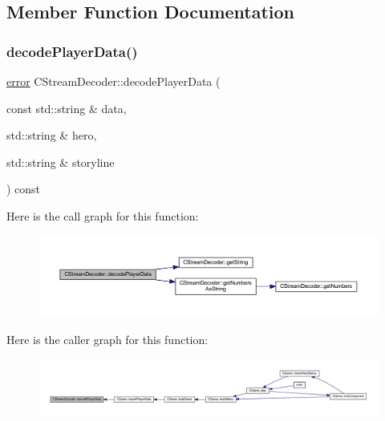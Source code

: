 \subsection{Member Function Documentation}
\mbox{\label{class_c_stream_decoder_a27f04fbbe2eb121fe15988594fe7053f}} 
\subsubsection{\texorpdfstring{decode\+Player\+Data()}{decodePlayerData()}}
{\footnotesize\ttfamily \mbox{\hyperlink{_errors_list_8h_af10dacfa214e2575bb2e0ee407c242e0}{error}} C\+Stream\+Decoder\+::decode\+Player\+Data (\begin{DoxyParamCaption}\item[{const std\+::string \&}]{data,  }\item[{std\+::string \&}]{hero,  }\item[{std\+::string \&}]{storyline }\end{DoxyParamCaption}) const}

Here is the call graph for this function\+:\nopagebreak
\begin{figure}[H]
\begin{center}
\leavevmode
\includegraphics[width=350pt]{class_c_stream_decoder_a27f04fbbe2eb121fe15988594fe7053f_cgraph}
\end{center}
\end{figure}
Here is the caller graph for this function\+:\nopagebreak
\begin{figure}[H]
\begin{center}
\leavevmode
\includegraphics[width=350pt]{class_c_stream_decoder_a27f04fbbe2eb121fe15988594fe7053f_icgraph}
\end{center}
\end{figure}
\mbox{\label{class_c_stream_decoder_a57a7f304974a6b5be31e374685b70e33}} 
